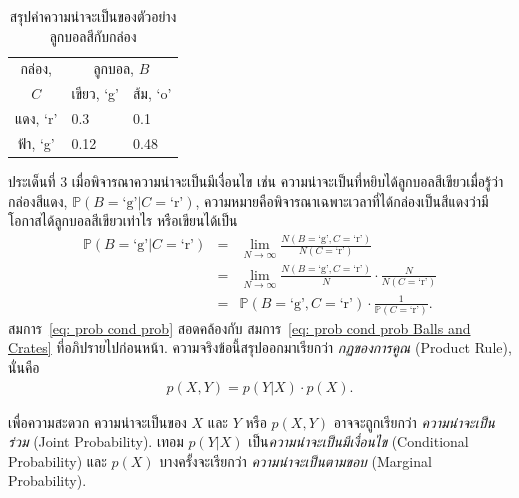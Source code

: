 \begin{table}[hbtp]
\caption{สรุปค่าความน่าจะเป็นของตัวอย่างลูกบอลสีกับกล่อง}
\begin{center}
\begin{tabular}{|c|l|l|}
\hline 
กล่อง, & \multicolumn{2}{c|}{ลูกบอล, $B$ } \\
    \cline{2-3}
$C$ & เขียว, `g' & ส้ม, `o' \\
\hline
แดง, `r' & 0.3 & 0.1 \\
\hline
ฟ้า, `g' & 0.12 & 0.48 \\
\hline
\end{tabular} 
\end{center}
\label{tbl: prob cond prob table}
\end{table}

ประเด็นที่ 3 เมื่อพิจารณาความน่าจะเป็นมีเงื่อนไข เช่น
ความน่าจะเป็นที่หยิบได้ลูกบอลสีเขียวเมื่อรู้ว่ากล่องสีแดง, $\mathbb{P}(B = \mbox{`g'}|C = \mbox{`r'})$, ความหมายคือพิจารณาเฉพาะเวลาที่ได้กล่องเป็นสีแดงว่ามีโอกาสได้ลูกบอลสีเขียวเท่าไร หรือเขียนได้เป็น
\begin{eqnarray}
\mathbb{P}(B = \mbox{`g'}| C = \mbox{`r'}) &=& \lim_{N \rightarrow \infty} \frac{ N(B = \mbox{`g'}, C = \mbox{`r'}) }{ N(C = \mbox{`r'}) }
\nonumber \\
 &=& \lim_{N \rightarrow \infty} \frac{ N(B = \mbox{`g'}, C = \mbox{`r'}) }{N} \cdot \frac{N}{ N(C = \mbox{`r'}) }
\nonumber \\
 &=&  \mathbb{P}(B = \mbox{`g'}, C = \mbox{`r'}) \cdot \frac{1}{\mathbb{P}(C = \mbox{`r'})}
\label{eq: prob cond prob}  .
\end{eqnarray}
สมการ~\ref{eq: prob cond prob} สอดคล้องกับ สมการ~\ref{eq: prob cond prob Balls and Crates} ที่อภิปรายไปก่อนหน้า.
ความจริงข้อนี้สรุปออกมาเรียกว่า \textit{กฏของการคูณ} (Product Rule), 
นั่นคือ
\begin{eqnarray}
p(X,Y) = p(Y|X) \cdot p(X)
\label{eq: prob product rule} .
\end{eqnarray}

เพื่อความสะดวก ความน่าจะเป็นของ $X$ และ $Y$ หรือ $p(X,Y)$ อาจจะถูกเรียกว่า \textit{ความน่าจะเป็นร่วม} (Joint Probability).
เทอม $p(Y|X)$ เป็น\textit{ความน่าจะเป็นมีเงื่อนไข} (Conditional Probability)
และ $p(X)$ บางครั้งจะเรียกว่า \textit{ความน่าจะเป็นตามขอบ} (Marginal Probability).


